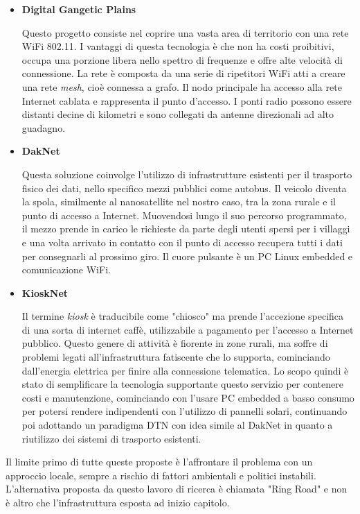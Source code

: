 \documentclass[a4paper]{article}
\begin{document}
			\begin{itemize}
				\item {\bf Digital Gangetic Plains}
				
				Questo progetto consiste nel coprire una vasta area di territorio con una rete WiFi 802.11. I vantaggi di questa tecnologia è che non ha costi proibitivi, occupa una porzione libera nello spettro di frequenze e offre alte velocità di connessione. La rete è composta da una serie di ripetitori WiFi atti a creare una rete {\it mesh}, cioè connessa a grafo. Il nodo principale ha accesso alla rete Internet cablata e rappresenta il punto d'accesso. I ponti radio possono essere distanti decine di kilometri e sono collegati da antenne direzionali ad alto guadagno. 
				
				\item {\bf DakNet}
				
				Questa soluzione coinvolge l'utilizzo di infrastrutture esistenti per il trasporto fisico dei dati, nello specifico mezzi pubblici come autobus. Il veicolo diventa la spola, similmente al nanosatellite nel nostro caso, tra la zona rurale e il punto di accesso a Internet. Muovendosi lungo il suo percorso programmato, il mezzo prende in carico le richieste da parte degli utenti spersi per i villaggi e una volta arrivato in contatto con il punto di accesso recupera tutti i dati per consegnarli al prossimo giro. Il cuore pulsante è un PC Linux embedded e comunicazione WiFi. 
				
				\item {\bf KioskNet}
				
				Il termine {\it kiosk} è traducibile come "chiosco" ma prende l'accezione specifica di una sorta di internet caffè, utilizzabile a pagamento per l'accesso a Internet pubblico. Questo genere di attività è fiorente in zone rurali, ma soffre di problemi legati all'infrastruttura fatiscente che lo supporta, cominciando dall'energia elettrica per finire alla connessione telematica. Lo scopo quindi è stato di semplificare la tecnologia supportante questo servizio per contenere costi e manutenzione, cominciando con l'usare PC embedded a basso consumo per potersi rendere indipendenti con l'utilizzo di pannelli solari, continuando poi adottando un paradigma DTN con idea simile al DakNet in quanto a riutilizzo dei sistemi di trasporto esistenti.
								
			\end{itemize}
			
			Il limite primo di tutte queste proposte è l'affrontare il problema con un approccio locale, sempre a rischio di fattori ambientali e politici instabili. L'alternativa proposta da questo lavoro di ricerca è chiamata "Ring Road" e non è altro che l'infrastruttura esposta ad inizio capitolo.
			
\end{document}
